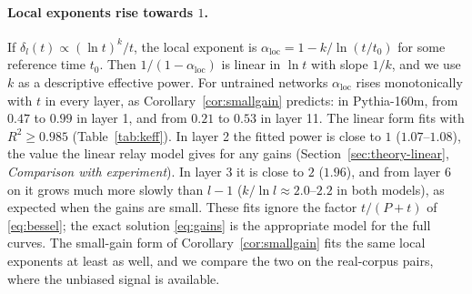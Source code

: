 \documentclass[11pt]{article}
\theoremstyle{definition}
\theoremstyle{remark}
\begin{document}
\paragraph{Local exponents rise towards $1$.} If $\delta_l(t)\propto(\ln t)^{k}/t$, the local exponent is $\alpha_{\mathrm{loc}}=1-k/\ln(t/t_0)$ for some reference time $t_0$. Then $1/(1-\alpha_{\mathrm{loc}})$ is linear in $\ln t$ with slope $1/k$, and we use $k$ as a descriptive effective power. For untrained networks $\alpha_{\mathrm{loc}}$ rises monotonically with $t$ in every layer, as Corollary~\ref{cor:smallgain} predicts: in Pythia-160m, from $0.47$ to $0.99$ in layer 1, and from $0.21$ to $0.53$ in layer 11. The linear form fits with $R^2\ge0.985$ (Table~\ref{tab:keff}). In layer 2 the fitted power is close to $1$ ($1.07$--$1.08$), the value the linear relay model gives for any gains (Section~\ref{sec:theory-linear}, \emph{Comparison with experiment}). In layer 3 it is close to $2$ ($1.96$), and from layer 6 on it grows much more slowly than $l-1$ ($k/\ln l\approx2.0$--$2.2$ in both models), as expected when the gains are small. These fits ignore the factor $t/(P+t)$ of \eqref{eq:bessel}; the exact solution \eqref{eq:gains} is the appropriate model for the full curves. The small-gain form of Corollary~\ref{cor:smallgain} fits the same local exponents at least as well, and we compare the two on the real-corpus pairs, where the unbiased signal is available.
\end{document}
